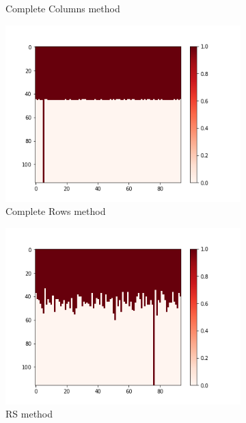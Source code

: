 \documentclass[10pt, conference, compsocconf]{IEEEtran}
\begin{document}
\begin{figure}[h!]
\begin{subfigure}[b]{0.4\linewidth}
  		\caption{Complete Columns method}
  		\label{fig:Columns-Sample-Training-set}
	\end{subfigure}
	\begin{subfigure}[b]{0.4\linewidth}
  		\includegraphics[width=\columnwidth]{figures/5vs7_rows_04_training}
  		\caption{Complete Rows method}
  		\label{fig:Rows-Sample-Training-set}
	\end{subfigure}
	\begin{subfigure}[b]{0.4\linewidth}
 		\includegraphics[width=\columnwidth]{figures/5vs7_random-real_04_training}
		\caption{RS method}
  		\label{fig:Uniform-S-Sample-Training-set}
	\end{subfigure}
	\begin{subfigure}[b]{0.4\linewidth}

\end{subfigure}
\end{figure}
\end{document}
